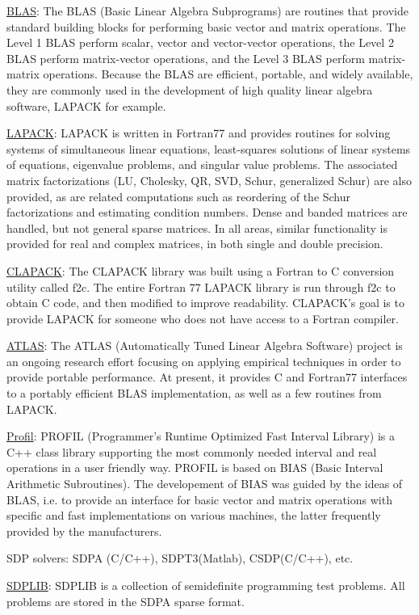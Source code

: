 \documentclass[a4paper,10pt]{article}
\begin{document}
\appendix
\begin{description}
\item{\href{http://www.netlib.org/blas}{BLAS}: } The BLAS (Basic Linear Algebra Subprograms) are routines that provide standard building blocks for performing basic vector and matrix operations. The Level 1 BLAS perform scalar, vector and vector-vector operations, the Level 2 BLAS perform matrix-vector operations, and the Level 3 BLAS perform matrix-matrix operations. Because the BLAS are efficient, portable, and widely available, they are commonly used in the development of high quality linear algebra software, LAPACK for example.
\item{\href{http://www.netlib.org/lapack}{LAPACK}: } LAPACK is written in Fortran77 and provides routines for solving systems of simultaneous linear equations, least-squares solutions of linear systems of equations, eigenvalue problems, and singular value problems. The associated matrix factorizations (LU, Cholesky, QR, SVD, Schur, generalized Schur) are also provided, as are related computations such as reordering of the Schur factorizations and estimating condition numbers. Dense and banded matrices are handled, but not general sparse matrices. In all areas, similar functionality is provided for real and complex matrices, in both single and double precision.
\item{\href{http://www.netlib.org/clapack/}{CLAPACK}: } The CLAPACK library was built using a Fortran to C conversion utility called f2c.
The entire Fortran 77 LAPACK library is run through f2c to obtain C code, and then modified to improve readability.  
CLAPACK's goal is to provide LAPACK for someone who does not have access to a Fortran compiler.
\item{\href{http://math-atlas.sourceforge.net}{ATLAS}: } The ATLAS (Automatically Tuned Linear Algebra Software) project is an ongoing research effort focusing on applying empirical techniques in order to provide portable performance. At present, it provides C and Fortran77 interfaces to a portably efficient BLAS implementation, as well as a few routines from LAPACK.
\item{\href{http://www.ti3.tu-harburg.de/Software/PROFILEnglisch.html}{Profil}: } PROFIL (Programmer's Runtime Optimized Fast Interval Library) is a C++ class library supporting the most commonly needed interval and real operations in a user friendly way. PROFIL is based on BIAS (Basic Interval Arithmetic Subroutines). The developement of BIAS was guided by the ideas of BLAS, i.e. to provide an interface for basic vector and matrix operations with specific and fast implementations on various machines, the latter frequently provided by the manufacturers.
\item{SDP solvers: } SDPA (C/C++), SDPT3(Matlab), CSDP(C/C++), etc.
\item{\href{http://infohost.nmt.edu/~sdplib}{SDPLIB}: } SDPLIB is a collection of semidefinite programming test problems. All problems are stored in the SDPA sparse format.
\end{description}
\end{document}
